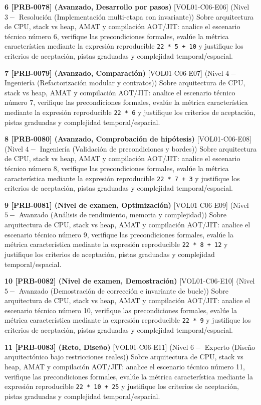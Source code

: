 \documentclass{book}
\begin{document}
\begin{tcolorbox}[title={Ejercicios}, studiumworked, breakable]
\noindent\textbf{6 [PRB-0078] (Avanzado, Desarrollo por pasos)}
[VOL01-C06-E06] (Nivel \(3 -\) Resolución (Implementación multi-etapa con invariante)) Sobre arquitectura de CPU, stack vs heap, AMAT y compilación AOT/JIT: analice el escenario técnico número 6, verifique las precondiciones formales, evalúe la métrica característica mediante la expresión reproducible \texttt{22 * 5 + 10} y justifique los criterios de aceptación, pistas graduadas y complejidad temporal/espacial.

\noindent\textbf{7 [PRB-0079] (Avanzado, Comparación)}
[VOL01-C06-E07] (Nivel \(4 -\) Ingeniería (Refactorización modular y contratos)) Sobre arquitectura de CPU, stack vs heap, AMAT y compilación AOT/JIT: analice el escenario técnico número 7, verifique las precondiciones formales, evalúe la métrica característica mediante la expresión reproducible \texttt{22 * 6} y justifique los criterios de aceptación, pistas graduadas y complejidad temporal/espacial.

\noindent\textbf{8 [PRB-0080] (Avanzado, Comprobación de hipótesis)}
[VOL01-C06-E08] (Nivel \(4 -\) Ingeniería (Validación de precondiciones y bordes)) Sobre arquitectura de CPU, stack vs heap, AMAT y compilación AOT/JIT: analice el escenario técnico número 8, verifique las precondiciones formales, evalúe la métrica característica mediante la expresión reproducible \texttt{22 * 7 + 3} y justifique los criterios de aceptación, pistas graduadas y complejidad temporal/espacial.

\noindent\textbf{9 [PRB-0081] (Nivel de examen, Optimización)}
[VOL01-C06-E09] (Nivel \(5 -\) Avanzado (Análisis de rendimiento, memoria y complejidad)) Sobre arquitectura de CPU, stack vs heap, AMAT y compilación AOT/JIT: analice el escenario técnico número 9, verifique las precondiciones formales, evalúe la métrica característica mediante la expresión reproducible \texttt{22 * 8 + 12} y justifique los criterios de aceptación, pistas graduadas y complejidad temporal/espacial.

\noindent\textbf{10 [PRB-0082] (Nivel de examen, Demostración)}
[VOL01-C06-E10] (Nivel \(5 -\) Avanzado (Demostración de corrección e invariante de bucle)) Sobre arquitectura de CPU, stack vs heap, AMAT y compilación AOT/JIT: analice el escenario técnico número 10, verifique las precondiciones formales, evalúe la métrica característica mediante la expresión reproducible \texttt{22 * 9} y justifique los criterios de aceptación, pistas graduadas y complejidad temporal/espacial.

\noindent\textbf{11 [PRB-0083] (Reto, Diseño)}
[VOL01-C06-E11] (Nivel \(6 -\) Experto (Diseño arquitectónico bajo restricciones reales)) Sobre arquitectura de CPU, stack vs heap, AMAT y compilación AOT/JIT: analice el escenario técnico número 11, verifique las precondiciones formales, evalúe la métrica característica mediante la expresión reproducible \texttt{22 * 10 + 25} y justifique los criterios de aceptación, pistas graduadas y complejidad temporal/espacial.


\end{tcolorbox}
\end{document}
